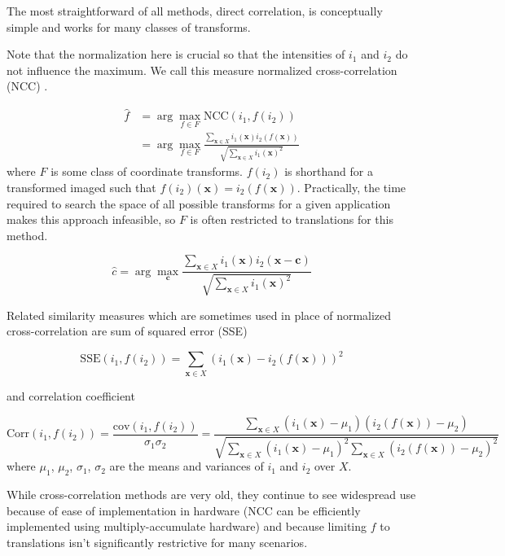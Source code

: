 \documentclass[tocnosub,noragright,centerchapter,12pt]{uiucecethesis09}
\begin{document}
The most straightforward of all methods, direct correlation, is conceptually simple and works for many classes of transforms.


Note that the normalization here is crucial so that the intensities of $i_1$ and $i_2$ do not influence the maximum.  We call this measure normalized cross-correlation (NCC) \cite{brown}.


$$
\begin{aligned}
\hat{f} &= \arg \max_{f \in F} \text{NCC}(i_1, f(i_2)) \\
&= \arg \max_{f \in F} \frac{\sum_{\bm{x} \in X} i_1(\bm{x})i_2(f(\bm{x}))}{\sqrt{\sum_{\bm{x} \in X} i_1(\bm{x})^2}}
\end{aligned}
$$
where $F$ is some class of coordinate transforms.  $f(i_2)$ is shorthand for a transformed imaged such that $f(i_2)(\bm{x}) = i_2(f(\bm{x}))$.  Practically, the time required to search the space of all possible transforms for a given application makes this approach infeasible, so $F$ is often restricted to translations for this method.

$$
\hat{c} = \arg \max_{\bm{c}} \frac{\sum_{\bm{x} \in X} i_1(\bm{x})i_2(\bm{x} - \bm{c})}{\sqrt{\sum_{\bm{x} \in X} i_1(\bm{x})^2}}
$$



Related similarity measures which are sometimes used in place of normalized cross-correlation are sum of squared error (SSE)

$$
\text{SSE}(i_1, f(i_2)) = \sum_{\bm{x} \in X} (i_1(\bm{x}) - i_2(f(\bm{x})))^2
$$

and correlation coefficient

$$
\text{Corr}(i_1, f(i_2)) = \frac{\text{cov}(i_1, f(i_2))}{\sigma_1 \sigma_2} = \frac{\sum_{\bm{x} \in X} (i_1(\bm{x}) - \mu_1)(i_2(f(\bm{x})) - \mu_2)}{\sqrt{\sum_{\bm{x} \in X} (i_1(\bm{x}) - \mu_1)^2 \sum_{\bm{x} \in X}(i_2(f(\bm{x})) - \mu_2)^2}}
$$
where $\mu_1$, $\mu_2$, $\sigma_1$, $\sigma_2$ are the means and variances of $i_1$ and $i_2$ over $X$.

While cross-correlation methods are very old, they continue to see widespread use because of ease of implementation in hardware (NCC can be efficiently implemented using multiply-accumulate hardware) and because limiting $f$ to translations isn't significantly restrictive for many scenarios.
\end{document}
